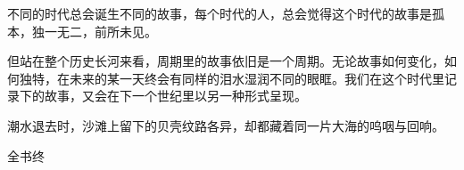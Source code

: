 

不同的时代总会诞生不同的故事，每个时代的人，总会觉得这个时代的故事是孤本，独一无二，前所未见。

但站在整个历史长河来看，周期里的故事依旧是一个周期。无论故事如何变化，如何独特，在未来的某一天终会有同样的泪水湿润不同的眼眶。我们在这个时代里记录下的故事，又会在下一个世纪里以另一种形式呈现。

潮水退去时，沙滩上留下的贝壳纹路各异，却都藏着同一片大海的呜咽与回响。

{\kaishu\hfill 全书终\par}
